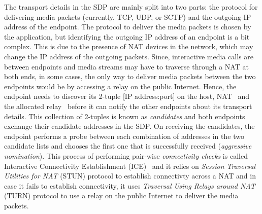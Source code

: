 The transport details in the SDP are mainly split into two parts: the protocol
for delivering media packets (currently, TCP, UDP, or SCTP) and the outgoing
IP address of the endpoint. The protocol to deliver the media packets is
chosen by the application, but identifying the outgoing IP address of an
endpoint is a bit complex. This is due to the presence of NAT devices in the
network, which may change the IP address of the outgoing packets. Since,
interactive media calls are between endpoints and media streams may have to
traverse through a NAT at both ends, in some cases, the only way to deliver
media packets between the two endpoints would be by accessing a relay on the
public Internet. Hence, the endpoint needs to discover its 2-tuple [IP
address:port] on the host, NAT~\cite{rfc5389} and the allocated
relay~\cite{rfc5766} before it can notify the other endpoints about its
transport details. This collection of 2-tuples is known as \emph{candidates}
and both endpoints exchange their candidate addresses in the SDP. On receiving
the candidates, the endpoint performs a probe between each combination of
addresses in the two candidate lists and chooses the first one that is
successfully received (\emph{aggressive nomination}). This process of
performing pair-wise \emph{connectivity checks} is called Interactive
Connectivity Establishment (ICE)~\cite{rfc5245} and it relies on \emph{Session
Traversal Utilities for NAT} (STUN) protocol to establish connectivty across a
NAT and in case it fails to establish connectivity, it uses \emph{Traversal
Using Relays around NAT} (TURN) protocol to use a relay on the public Internet
to deliver the media packets.



